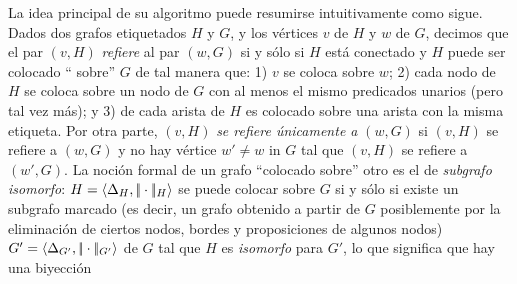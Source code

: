 La idea principal de su algoritmo puede resumirse intuitivamente como sigue.
Dados dos grafos etiquetados $H$ y $G$, y los v\'ertices  $v$ de $H$
y $w$ de $G$, decimos que el par $(v, H)$ {\em refiere}
al par $(w, G)$ si y s\'olo si $H$ est\'a conectado y $H$ puede ser colocado ``
sobre'' $G$ de tal manera que: 1) $v$ se coloca sobre $w$; 2) cada
nodo de $H$ se coloca sobre un nodo de $G$ con al menos el mismo
predicados unarios (pero tal vez m\'as); y 3) de cada arista de $H$ es
colocado sobre una arista con la misma etiqueta. Por otra parte, $(v, H)$ {\em
se refiere \'unicamente a} $(w, G)$ si $(v, H)$ se refiere a $(w, G)$ y no hay
v\'ertice $w'\not=w$ in $G$ tal que $(v, H)$ se refiere a $(w', G)$.
La noci\'on formal de un grafo ``colocado sobre'' otro es el de {\em subgrafo isomorfo}:
$H=\langle \Delta_H,|\!|\cdot|\!|_H \rangle$ se puede colocar sobre
$G$ si y s\'olo si existe un subgrafo marcado (es decir, un grafo obtenido a partir de
$G$ posiblemente por la eliminaci\'on de ciertos nodos, bordes y proposiciones de algunos nodos)
$G'=\langle \Delta_{G'},|\!|\cdot|\!|_{G'} \rangle$ de $G$ tal que $H$ es {\em
isomorfo} ​​para $G'$, lo que significa que hay una biyecci\'on

